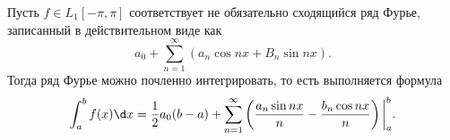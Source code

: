 
\begin{to_thr}
    Пусть $f \in L_1 [-\pi, \pi]$ соответствует не обязательно сходящийся ряд Фурье, записанный в действительном виде как
    \begin{equation*}
        a_0 + \sum_{n=1}^{\infty} (a_n \cos nx + B_n \sin nx).
    \end{equation*}
    Тогда ряд Фурье можно почленно интегрировать, то есть выполняется формула
    \begin{equation*}
        \int_a^b f(x) \d x =    
        \frac{1}{2} a_0 (b-a) + 
        \sum_{n=1}^{\infty} \left(
            \frac{a_n \sin n x}{n} -
            \frac{b_n \cos nx }{n}
        \right) \bigg|_a^b.
    \end{equation*}
\end{to_thr}


